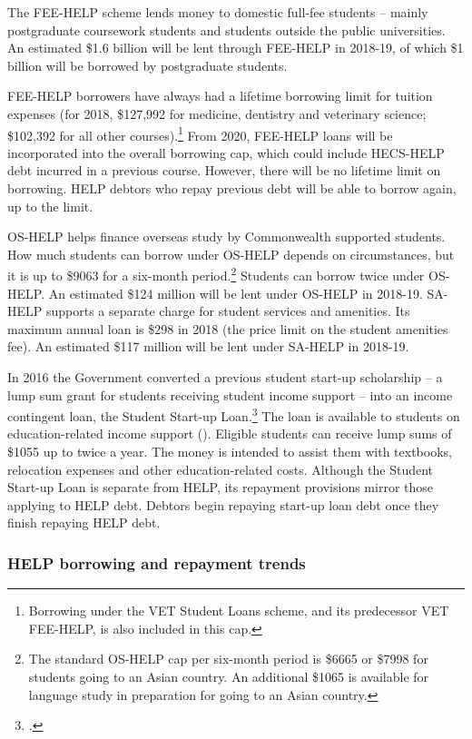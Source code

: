 \documentclass{grattan}
\begin{document}
The FEE-HELP scheme lends money to domestic full-fee students -- mainly postgraduate coursework students and students outside the public universities. An estimated \$1.6 billion will be lent through FEE-HELP in 2018-19, of which \$1 billion will be borrowed by postgraduate students.

FEE-HELP borrowers have always had a lifetime borrowing limit for tuition expenses (for 2018, \$127,992 for medicine, dentistry and veterinary science; \$102,392 for all other courses).\footnote{Borrowing under the VET Student Loans scheme, and its predecessor VET FEE-HELP, is also included in this cap.} From 2020, FEE-HELP loans will be incorporated into the overall borrowing cap, which could include HECS-HELP debt incurred in a previous course. However, there will be no lifetime limit on borrowing. HELP debtors who repay previous debt will be able to borrow again, up to the limit.

OS-HELP helps finance overseas study by Commonwealth supported students. How much students can borrow under OS-HELP depends on circumstances, but it is up to \$9063 for a six-month period.\footnote{The standard OS-HELP cap per six-month period is \$6665 or \$7998 for students going to an Asian country. An additional \$1065 is available for language study in preparation for going to an Asian country.} Students can borrow twice under OS-HELP. An estimated \$124 million will be lent under OS-HELP in 2018-19. SA-HELP supports a separate charge for student services and amenities. Its maximum annual loan is \$298 in 2018 (the price limit on the student amenities fee). An estimated \$117 million will be lent under SA-HELP in 2018-19.

In 2016 the Government converted a previous student start-up scholarship -- a lump sum grant for students receiving student income support -- into an income contingent loan, the Student Start-up Loan.\footcite[][]{DepartmentofHumanServices2016studentstartuplo} The loan is available to students on education-related income support (). Eligible students can receive lump sums of \$1055 up to twice a year. The money is intended to assist them with textbooks, relocation expenses and other education-related costs. Although the Student Start-up Loan is separate from HELP, its repayment provisions mirror those applying to HELP debt. Debtors begin repaying start-up loan debt once they finish repaying HELP debt.


\subsubsection{
HELP borrowing and repayment trends }\label{help-borrowing-and-repayment-trends}
\end{document}

